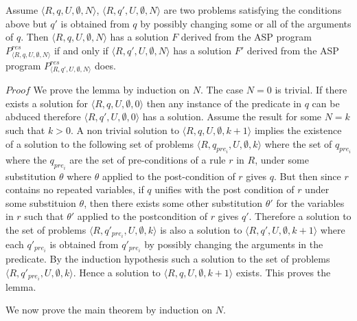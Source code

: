 \begin{lemma}
Assume $\langle R,q,U,\emptyset,N\rangle$, $\langle R,q',U,\emptyset,N\rangle$ are two
problems satisfying the conditions above but $q'$ is obtained from $q$ by
possibly changing some or all of the arguments of $q$. Then $\langle
R,q,U,\emptyset,N\rangle$ has a solution $F$ derived from the ASP program $P_{\langle R,q,U,\emptyset,N\rangle}^{res}$ if and only if $\langle R,q',U,\emptyset,N\rangle$ has a solution $F'$ derived from the ASP program $P_{\langle R,q',U,\emptyset,N\rangle}^{res}$
does.
\end{lemma}

$Proof$ We prove the lemma by induction on $N$.
The case $N = 0$ is trivial. If there exists a solution for $\langle
R,q,U,\emptyset,0\rangle$ then any instance of the predicate in $q$ can be
abduced therefore $\langle R,q',U,\emptyset,0\rangle$ has a solution. Assume
the result for some $N = k$ such that $k>0$. A non trivial solution to
$\langle R,q,U,\emptyset,k+1\rangle$ implies the existence of a solution to
the following set of problems $\langle R,q_{pre_{i}},U,\emptyset,k\rangle$
where the set of $q_{pre_{i}}$ where the $q_{pre_{i}}$ are the set of
pre-conditions of a rule $r$ in $R$, under some substitution $\theta$ where
$\theta$ applied to the post-condition of $r$ gives $q$. But then since $r$
contains no repeated variables, if $q$ unifies with the post condition of $r$
under some substituion $\theta$, then there exists some other substitution
$\theta'$ for the variables in $r$ such that $\theta'$ applied to the
postcondition of $r$ gives $q'$. Therefore a solution to the set of problems
$\langle R,q'_{pre_{i}},U,\emptyset,k\rangle$ is also a solution to $\langle
R,q',U,\emptyset,k+1\rangle$ where each $q'_{pre_{i}}$ is obtained from
$q'_{pre_{i}}$ by possibly changing the arguments in the predicate. By the
induction hypothesis such a solution to the set of problems $\langle
R,q'_{pre_{i}},U,\emptyset,k\rangle$. Hence a solution to  $\langle
R,q,U,\emptyset,k+1\rangle$ exists. This proves the lemma.

We now prove the main theorem by induction on $N$. 

